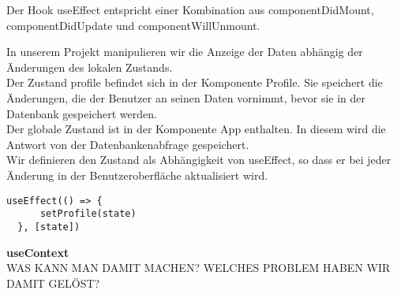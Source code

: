 Der Hook useEffect entspricht einer Kombination aus componentDidMount, componentDidUpdate und componentWillUnmount.

In unserem Projekt manipulieren wir die Anzeige der Daten abhängig der Änderungen des lokalen Zustands.\\
Der Zustand profile befindet sich in der Komponente Profile.
Sie speichert die Änderungen, die der Benutzer an seinen Daten vornimmt, bevor sie in der Datenbank gespeichert werden.
\\
Der globale Zustand ist in der Komponente App enthalten.
In diesem wird die Antwort von der Datenbankenabfrage gespeichert.
\\
Wir definieren den Zustand als  Abhängigkeit von useEffect, so dass er bei jeder Änderung in der Benutzeroberfläche aktualisiert wird.
\\
\begin{lstlisting}
useEffect(() => { 
      setProfile(state)      
  }, [state])           
\end{lstlisting}

  
\textbf{useContext} \\
WAS KANN MAN DAMIT MACHEN?
WELCHES PROBLEM HABEN WIR DAMIT GELÖST?



